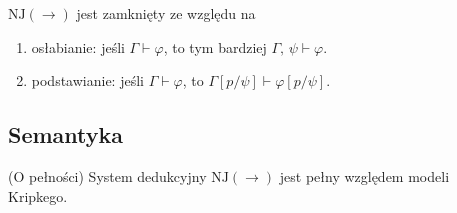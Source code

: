 \begin{lemat}
  \(\mathrm{NJ}(\to)\) jest zamknięty ze względu na
  \begin{enumerate}[label=({\alph*})]
    \item osłabianie: jeśli \(\Gamma\vdash\varphi\), to tym bardziej \(\Gamma,\,\psi \vdash \varphi\).
    \item podstawianie: jeśli  \(\Gamma\vdash\varphi\), to \(\Gamma[p/\psi]\vdash\varphi[p/\psi]\).
  \end{enumerate}
\end{lemat}

\subsection{Semantyka}
\begin{twierdzenie}{(O pełności)}
  System dedukcyjny \(\mathrm{NJ}(\to)\) jest pełny względem modeli Kripkego.
\end{twierdzenie}
